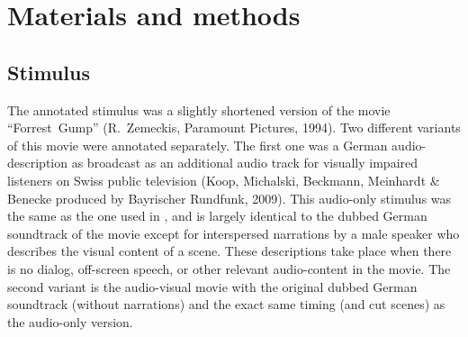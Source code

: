 \section*{Materials and methods} 




\subsection*{Stimulus}

The annotated stimulus was a slightly shortened version of the movie
``Forrest~Gump'' (R.~Zemeckis, Paramount Pictures, 1994). Two different
variants of this movie were annotated separately. The first one was a German
audio-description as broadcast as an additional audio track for visually
impaired listeners on Swiss public television (Koop, Michalski, Beckmann,
Meinhardt \& Benecke produced by Bayrischer Rundfunk, 2009). This audio-only
stimulus was the same as the one used in \cite[contains instructions on how to
reproduce the stimulus from the DVD release]{HBI+14}, and is largely
identical to the dubbed German soundtrack of the movie except for interspersed
narrations by a male speaker who describes the visual content of a scene. These
descriptions take place when there is no dialog, off-screen speech, or other
relevant audio-content in the movie. The second variant is the audio-visual
movie with the original dubbed German soundtrack (without narrations) and the
exact same timing (and cut scenes) as the audio-only version.

